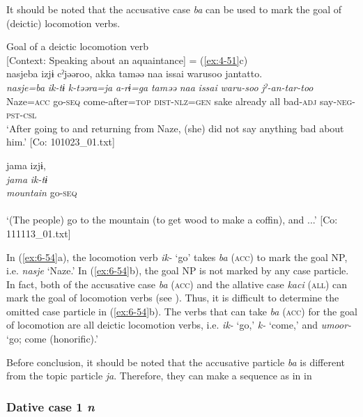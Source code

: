 It should be noted that the accusative case \textit{ba} can be used to mark the goal of (deictic) locomotion verbs.

\ea\label{ex:6-54}
 Goal of a deictic locomotion verb\\

 \ea
 {\TM}
 [Context: Speaking about an aquaintance] = (\ref{ex:4-51}c)\\
\glll nasjeba  izjɨ  cˀjəəroo,  akka  taməə  naa  issai  warusoo  jantatto.\\
\textit{nasje=ba}  \textit{ik-tɨ}  \textit{k-təəra=ja}  \textit{a-rɨ=ga}  \textit{taməə}      \textit{naa}  \textit{issai}  \textit{waru-soo}  \textit{jˀ-an-tar-too}\\
Naze=\textsc{acc}  go-\textsc{seq}  come-after=\textsc{top}  \textsc{dist}-\textsc{nlz}=\textsc{gen}  sake    already  all  bad-\textsc{adj}  say-\textsc{neg}-\textsc{pst}-\textsc{csl}\\
\glt ‘After going to and returning from Naze, (she) did not say anything bad about him.’ [Co: 101023\_01.txt]

\ex
{\TM}
\glll  jama  izjɨ,\\
\textit{jama}  \textit{ik-tɨ}\\
\textit{mountain}  go-\textsc{seq}\\\\
\glt ‘(The people) go to the mountain (to get wood to make a coffin), and ...’ [Co: 111113\_01.txt]
\z
\z

In (\ref{ex:6-54}a), the locomotion verb \textit{ik-} ‘go’ takes \textit{ba} (\textsc{acc}) to mark the goal NP, i.e. \textit{nasje} ‘Naze.’ In (\ref{ex:6-54}b), the goal NP is not marked by any case particle. In fact, both of the accusative case \textit{ba} (\textsc{acc}) and the allative case \textit{kaci} (\textsc{all}) can mark the goal of locomotion verbs (see ). Thus, it is difficult to determine the omitted case particle in (\ref{ex:6-54}b). The verbs that can take \textit{ba} (\textsc{acc}) for the goal of locomotion are all deictic locomotion verbs, i.e. \textit{ik-} ‘go,’ \textit{k-} ‘come,’ and \textit{umoor-} ‘go; come (honorific).’

  Before conclusion, it should be noted that the accusative particle \textit{ba} is different from the topic particle \textit{ja}. Therefore, they can make a sequence as in  in 

\subsubsection{Dative case 1 \textit{n}}


